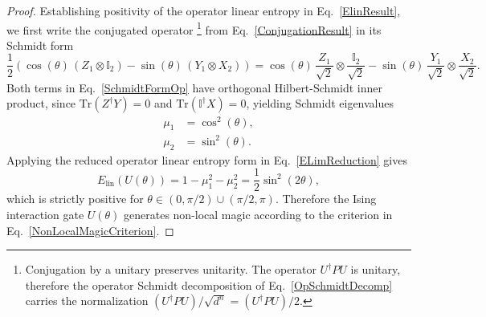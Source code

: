 \documentclass[10pt,a4paper]{amsart}
\begin{document}
\begin{proof}
Establishing positivity of the operator linear entropy in Eq.\ \eqref{ElinResult}, we first write the conjugated operator%
%
\footnote{Conjugation by a unitary preserves unitarity. The operator $U^\dagger P U$ is unitary, therefore the operator Schmidt decomposition of Eq.\ \eqref{OpSchmidtDecomp} carries the normalization $(U^\dagger P U)/\sqrt{d^n} = (U^\dagger P U)/2$.} %
%
from Eq.\ \eqref{ConjugationResult} in its Schmidt form
%
\begin{equation}\label{SchmidtFormOp}
\frac{1}{2}\left(\cos(\theta)\,(Z_1\otimes\mathbb{I}_2) - \sin(\theta)\,(Y_1\otimes X_2)\right) = \cos(\theta)\,\frac{Z_1}{\sqrt{2}}\otimes\frac{\mathbb{I}_2}{\sqrt{2}} - \sin(\theta)\,\frac{Y_1}{\sqrt{2}}\otimes\frac{X_2}{\sqrt{2}}.
\end{equation}
%
Both terms in Eq.\ \eqref{SchmidtFormOp} have orthogonal Hilbert-Schmidt inner product, since $\mathrm{Tr}(Z^\dagger Y) = 0$ and $\mathrm{Tr}(\mathbb{I}^\dagger X) = 0$, yielding Schmidt eigenvalues 
%
\begin{equation}
\begin{split}
    \mu_1 &= \cos^2(\theta),\\
    \mu_2 &= \sin^2(\theta).
\end{split}
\end{equation}
%
Applying the reduced operator linear entropy form in Eq.\ \eqref{ELimReduction} gives
%
\begin{equation}
E_{\mathrm{lin}}(U(\theta)) = 1 - \mu_1^2 - \mu_2^2 = \frac{1}{2}\sin^2(2\theta),
\end{equation}
%
which is strictly positive for $\theta\in(0,\pi/2)\cup(\pi/2,\pi)$. Therefore the Ising interaction gate $U(\theta)$ generates non-local magic according to the criterion in Eq.\ \eqref{NonLocalMagicCriterion}.
\end{proof}
\end{document}
